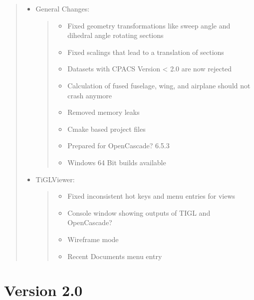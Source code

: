 \documentclass[]{scrartcl}
\begin{document}
\begin{quote}
\begin{itemize}
\item
  General Changes:

  \begin{quote}
  \begin{itemize}
  \itemsep1pt\parskip0pt
  \item
    Fixed geometry transformations like sweep angle and dihedral angle
    rotating sections
  \item
    Fixed scalings that lead to a translation of sections
  \item
    Datasets with CPACS Version \textless{} 2.0 are now rejected
  \item
    Calculation of fused fuselage, wing, and airplane should not crash
    anymore
  \item
    Removed memory leaks
  \item
    Cmake based project files
  \item
    Prepared for OpenCascade? 6.5.3
  \item
    Windows 64 Bit builds available
  \end{itemize}
  \end{quote}
\item
  TiGLViewer:

  \begin{quote}
  \begin{itemize}
  \itemsep1pt\parskip0pt
  \item
    Fixed inconsistent hot keys and menu entries for views
  \item
    Console window showing outputs of TIGL and OpenCascade?
  \item
    Wireframe mode
  \item
    Recent Documents menu entry
  \end{itemize}
  \end{quote}
\end{itemize}
\end{quote}

\section{Version 2.0}
\end{document}
